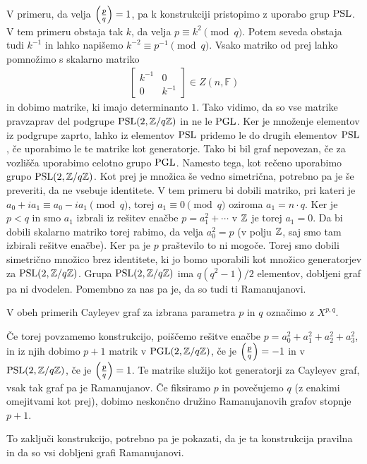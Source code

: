V primeru, da velja \(\left(\frac{p}{q}\right) = 1\), pa k konstrukciji pristopimo z uporabo grup \(\operatorname{PSL}\). V tem primeru obstaja tak \(k\), da velja \(p\equiv k^2 \pmod q\). Potem seveda obstaja tudi \(k^{-1}\) in lahko napišemo \(k^{-2} \equiv p^{-1}\pmod q\). Vsako matriko od prej lahko pomnožimo s skalarno matriko
\begin{align*}
    \begin{bmatrix}
        k^{-1} & 0 \\
        0 & k^{-1}
    \end{bmatrix}\in Z(n, \mathbb F)
\end{align*}
in dobimo matrike, ki imajo determinanto \(1\). Tako vidimo, da so vse matrike pravzaprav del podgrupe \(\operatorname{PSL}(2, \mathbb Z/q\mathbb Z)\) in ne le \(\operatorname{PGL}\). Ker je množenje elementov iz podgrupe zaprto, lahko iz elementov \(\operatorname{PSL}\) pridemo le do drugih elementov \(\operatorname{PSL}\), če uporabimo le te matrike kot generatorje. Tako bi bil graf nepovezan, če za vozlišča uporabimo celotno grupo \(\operatorname{PGL}\). Namesto tega, kot rečeno uporabimo grupo \(\operatorname{PSL}(2, \mathbb Z/q\mathbb Z)\). Kot prej je množica še vedno simetrična, potrebno pa je še preveriti, da ne vsebuje identitete. V tem primeru bi dobili matriko, pri kateri je \(a_0 +ia_1 \equiv a_0 - ia_1 \pmod q\), torej \(a_1 \equiv 0 \pmod q\) oziroma \(a_1 = n\cdot q\). Ker je \(p<q\) in smo \(a_1\) izbrali iz rešitev enačbe \(p=a_1^2 + \cdots\) v \(\mathbb Z\) je torej \(a_1=0\). Da bi dobili skalarno matriko torej rabimo, da velja \(a_0^2 = p\) (v polju \(\mathbb Z\), saj smo tam izbirali rešitve enačbe). Ker pa je \(p\) praštevilo to ni mogoče. Torej smo dobili simetrično množico brez identitete, ki jo bomo uporabili kot množico generatorjev za \(\operatorname{PSL}(2, \mathbb Z/q\mathbb Z)\). Grupa \(\operatorname{PSL}(2, \mathbb Z/q\mathbb Z)\) ima \(q(q^2-1)/2\) elementov, dobljeni graf pa ni dvodelen. Pomembno za nas pa je, da so tudi ti Ramanujanovi. 

V obeh primerih Cayleyev graf za izbrana parametra \(p\) in \(q\) označimo z \(X^{p,q}\).

Če torej povzamemo konstrukcijo, poiščemo rešitve enačbe \(p = a_0^2 + a_1^2 + a_2^2 + a_3^2\), in iz njih dobimo \(p+1\) matrik v \(\operatorname{PGL}(2, \mathbb Z/q\mathbb Z)\), če je \(\left(\frac{p}{q}\right)=-1\) in v \(\operatorname{PSL}(2, \mathbb Z/q\mathbb Z)\), če je \(\left(\frac{p}{q}\right)=1\). Te matrike služijo kot generatorji za Cayleyev graf, vsak tak graf pa je Ramanujanov. Če fiksiramo \(p\) in povečujemo \(q\) (z enakimi omejitvami kot prej), dobimo neskončno družino Ramanujanovih grafov stopnje \(p+1\).

To zaključi konstrukcijo, potrebno pa je pokazati, da je ta konstrukcija pravilna in da so vsi dobljeni grafi Ramanujanovi.

